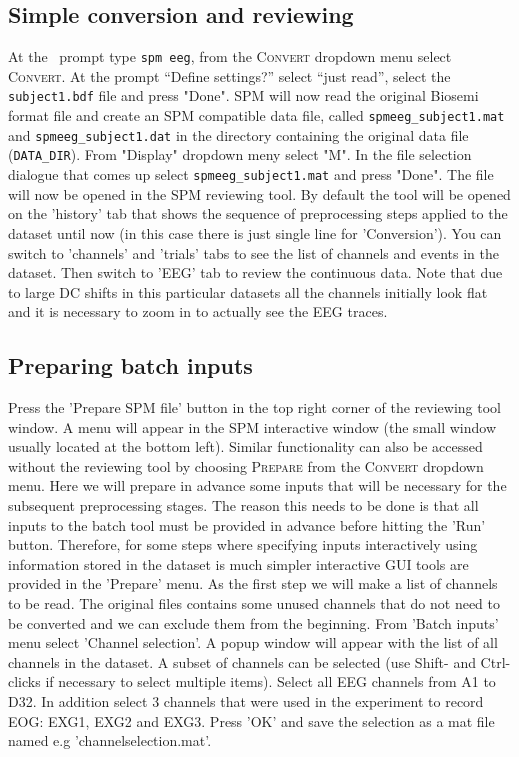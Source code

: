 \subsection{Simple conversion and reviewing}

At the \matlab\ prompt type \texttt{spm eeg}, from the \textsc{Convert} dropdown menu  select \textsc{Convert}. At the prompt ``Define settings?'' select ``just read'',  select the \texttt{subject1.bdf} file and press "Done". SPM will now read the original Biosemi format file and create an SPM compatible data file, called \texttt{spmeeg\_subject1.mat} and \texttt{spmeeg\_subject1.dat} in the directory containing the original data file (\texttt{DATA\_DIR}). From "Display" dropdown meny select "M\EEG". In the file selection dialogue that comes up select \texttt{spmeeg\_subject1.mat} and press "Done". The file will now be opened in the SPM reviewing tool. By default the tool will be opened on the 'history' tab that shows the sequence of preprocessing steps applied to the dataset until now (in this case there is just single line for 'Conversion'). You can switch to 'channels' and 'trials' tabs to see the list of channels and events in  the dataset. Then switch to 'EEG' tab to review the continuous data. Note that due to large DC shifts in this particular datasets all the channels initially look flat and it is necessary to zoom in to actually see the EEG traces. 

\subsection{Preparing batch inputs}
Press the 'Prepare SPM file' button in the top right corner of the reviewing tool window. A menu will appear in the SPM interactive window (the small window usually located at the bottom left). Similar functionality can also be accessed without the reviewing tool by choosing \textsc{Prepare} from the \textsc{Convert} dropdown menu. Here we will prepare in advance some inputs that will be necessary for the subsequent preprocessing stages. The reason this needs to be done is that all inputs to the batch tool must be provided in advance before hitting the 'Run' button. Therefore, for some steps where specifying inputs interactively using information stored in the dataset is much simpler interactive GUI tools are provided in the 'Prepare' menu. As the first step we will make a list of channels to be read. The original files contains some unused channels that do not need to be converted and we can exclude them from the beginning. From 'Batch inputs' menu select 'Channel selection'. A popup window will appear with the list of all channels in the dataset. A subset of channels can be selected (use Shift- and Ctrl- clicks if necessary to select multiple items). Select all EEG channels from A1 to D32. In addition select 3 channels that were used in the experiment to record EOG: EXG1, EXG2 and EXG3. Press 'OK' and save the selection as a mat file named e.g 'channelselection.mat'.

